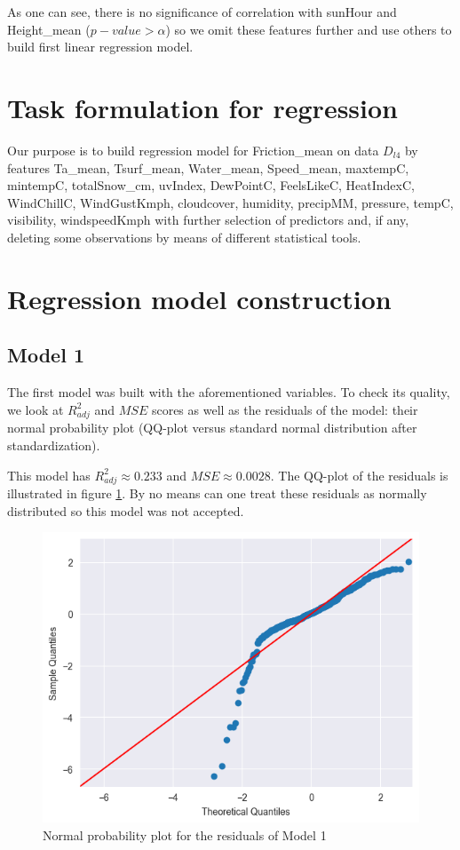 \documentclass[12pt, bachelor, substylefile = algo_title.rtx]{disser}
\theoremstyle{definition}
\begin{document}
As one can see, there is no significance of correlation with sunHour and Height\_mean ($p-value > \alpha$) so we omit these features further and use others to build first linear regression model.

\section{Task formulation for regression}
Our purpose is to build regression model for Friction\_mean on data $D_{l4}$ by features Ta\_mean, Tsurf\_mean,
       Water\_mean, Speed\_mean, maxtempC, mintempC, totalSnow\_cm,
      uvIndex, DewPointC, FeelsLikeC, HeatIndexC,
      WindChillC, WindGustKmph, cloudcover, humidity, precipMM,
       pressure, tempC, visibility, windspeedKmph with further selection of predictors and, if any, deleting some observations by means of different statistical tools.

\section{Regression model construction}
\subsection{Model 1}
The first model was built with the aforementioned variables. To check its quality, we look at $R_{adj}^2$ and $MSE$ scores as well as the residuals of the model: their normal probability plot (QQ-plot versus standard normal distribution after standardization).

This model has $R_{adj}^2 \approx 0.233$ and $MSE \approx 0.0028$. The QQ-plot of the residuals is illustrated in figure \ref{fig: 7}. By no means can one treat these residuals as normally distributed so this model was not accepted. 

\begin{figure}[!h]
   \begin{minipage}{\textwidth}
     \includegraphics[width=\linewidth]{resqq1}
   \end{minipage}
\caption{Normal probability plot for the residuals of Model 1}
\label{fig: 7}
\end{figure}
\end{document}

